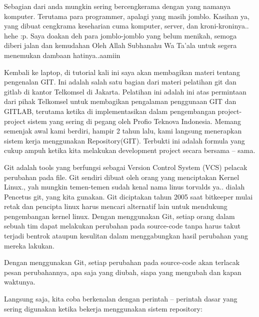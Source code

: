   
\vspace{12pt}
\vspace{12pt}
\vspace{12pt}
\noindent 
Sebagian dari anda mungkin sering bercengkerama dengan yang namanya komputer. Terutama para programmer, apalagi yang masih jomblo. Kasihan ya, yang dibuat cengkrama keseharian cuma komputer, server, dan kroni-kroninya.. hehe :p. Saya doakan deh para jomblo-jomblo yang belum menikah, semoga diberi jalan dan kemudahan Oleh Allah Subhanahu Wa Ta’ala untuk segera menemukan dambaan hatinya..aamiin \par
\noindent 
Kembali ke laptop, di tutorial kali ini saya akan membagikan materi tentang pengenalan GIT. Ini adalah salah satu bagian dari materi pelatihan git dan gitlab di kantor Telkomsel di Jakarta. Pelatihan ini adalah ini atas permintaan dari pihak Telkomsel untuk membagikan pengalaman penggunaan GIT dan GITLAB, terutama ketika di implementasikan dalam pengembangan project-project sistem yang sering di pegang oleh Profio Teknova Indonesia. Memang semenjak awal kami berdiri, hampir 2 tahun lalu, kami langsung menerapkan sistem kerja menggunakan Repository(GIT). Terbukti ini adalah formula yang cukup ampuh ketika kita melakukan development project secara bersama – sama. \par
\vspace{12pt}
\noindent 
Git adalah tools yang berfungsi sebagai Version Control System (VCS) pelacak perubahan pada file. Git sendiri dibuat oleh orang yang menciptakan Kernel Linux., yah mungkin temen-temen sudah kenal nama linus torvalds ya.. dialah Pencetus git, yang kita gunakan. Git diciptakan tahun 2005 saat bitkeeper mulai retak dan pencipta linux harus mencari alternatif lain untuk mendukung pengembangan kernel linux. Dengan menggunakan Git, setiap orang dalam sebuah tim dapat melakukan perubahan pada source-code tanpa harus takut terjadi bentrok ataupun kesulitan dalam menggabungkan hasil perubahan yang mereka lakukan. \par
\noindent 
\vspace{\baselineskip}
Dengan menggunakan Git, setiap perubahan pada source-code akan terlacak pesan perubahannya, apa saja yang diubah, siapa yang mengubah dan kapan waktunya. \par
\vspace{12pt}
\noindent 
Langsung saja, kita coba berkenalan dengan perintah – perintah dasar yang sering digunakan ketika bekerja menggunakan sistem repository: \par
\vspace{12pt}
